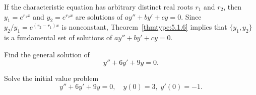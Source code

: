 If the characteristic equation has arbitrary distinct real roots $r_{1}$ and $r_{2}$, then
$y_{1}=e^{r_{1}x}$ and $y_{2}=e^{r_{2}x}$ are solutions of $ay''+by'+cy=0$. Since
$y_{2}/y_{1}=e^{(r_{2}-r_{1})x}$ is nonconstant, Theorem~\ref{thmtype:5.1.6} implies that
$\{y_{1},y_{2}\}$ is a fundamental set of solutions of $ay''+by'+cy=0$.

\newpage
{}

\noindent
\begin{example}
  \label{example:5.2.2}\rm \mbox{}
  \newline
  \begin{alist}
    \item %
    Find the general solution of
    \begin{equation}
      \label{eq:5.2.8}y''+6y'+9y=0.
    \end{equation}

    \item %
    Solve the initial value problem
    \begin{equation}
      \label{eq:5.2.9}y''+6y'+9y=0,\quad y(0)=3,\;y'(0)=-1.
    \end{equation}
  \end{alist}
\end{example}

